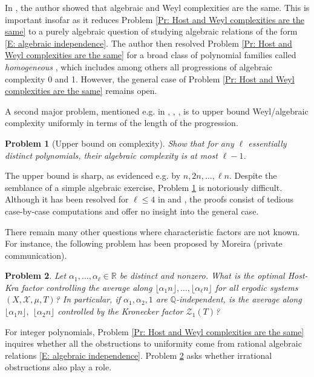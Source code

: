 \documentclass[11pt]{amsart}
\newtheorem{problem}{Problem}
\theoremstyle{definition}
\newcommand{\Q}{{\mathbb Q}}
\newcommand{\R}{{\mathbb R}}
\newcommand{\CX}{{\mathcal X}}
\newcommand{\CZ}{{\mathcal Z}}
\newcommand{\1}{{\mathbf{1}}}
\newcommand{\sfloor}[1]{{\lfloor #1 \rfloor}}
\begin{document}
In \cite[Theorem 1.18]{Kuc22a}, the author showed that algebraic and Weyl complexities are the same.
This is important insofar as it 
reduces Problem \ref{Pr: Host and Weyl complexities are the same} to 
a purely algebraic question of studying algebraic relations of the form \eqref{E: algebraic independence}. The author then resolved Problem \ref{Pr: Host and Weyl complexities are the same} for a broad class of polynomial families called \emph{homogeneous} \cite[Theorem 1.11]{Kuc22a}, which includes among others all progressions of algebraic complexity 0 and 1. However, the general case
of Problem  \ref{Pr: Host and Weyl complexities are the same} remains open.

A second major problem, mentioned e.g. in \cite[Section 0.9]{L09}, \cite[Section 5]{BLL07}, \cite[Problem 9]{Fr16}, \cite[Conjecture 1.9]{Kuc22a} is to upper bound Weyl/algebraic complexity uniformly in terms of the length of the progression.
\begin{problem}[Upper bound on complexity]\label{Pr: upper bound on complexity}
        Show that for any $\ell$ essentially distinct polynomials, their algebraic complexity is at most $\ell-1$.
\end{problem}
The upper bound is sharp, as evidenced e.g. by $n, 2n, \ldots, \ell n$.
Despite the semblance of a simple algebraic exercise, Problem \ref{Pr: upper bound on complexity} is notoriously difficult. Although it has been resolved for $\ell\leq 4$ in \cite[Proposition 3.5]{Fr08} and \cite[Theorem 1.1]{McClendon}, the proofs consist of tedious case-by-case computations and offer no insight into the general case.

There remain many other questions where characteristic factors are not known. For instance, the following problem has been proposed by Moreira (private communication).
\begin{problem}\label{Pr: Moreira}
    Let $\alpha_1, \ldots, \alpha_\ell\in\R$ be distinct and nonzero. What is the optimal Host-Kra factor controlling the average along $\sfloor{\alpha_1 n}, \ldots, \sfloor{\alpha_\ell n}$ for all ergodic systems $(X, \CX, \mu, T)$? In particular, if $\alpha_1, \alpha_2, 1$ are $\Q$-independent, is the average along $\sfloor{\alpha_1 n},$ $\sfloor{\alpha_2 n}$  controlled by the Kronecker factor $\CZ_1(T)$?
\end{problem}
For integer polynomials, Problem \ref{Pr: Host and Weyl complexities are the same} inquires whether all the obstructions to uniformity come from rational algebraic relations \eqref{E: algebraic independence}. Problem \ref{Pr: Moreira} asks whether irrational obstructions also play a role. 
\end{document}
